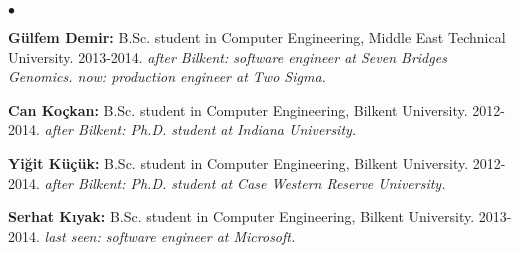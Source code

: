 \documentclass[margin,line]{res}
\newenvironment{list2}{
  \begin{list}{$\bullet$}{%
      \setlength{\itemsep}{0.1cm}
      \setlength{\parsep}{0in} \setlength{\parskip}{0in}
      \setlength{\topsep}{0in} \setlength{\partopsep}{0in} 
      \setlength{\leftmargin}{0.2in}}}{\end{list}}
\begin{document}
\begin{resume}
\begin{list2}
\item {\bf Gülfem Demir:} B.Sc. student in Computer Engineering,  Middle East Technical University. 2013-2014. {\it after Bilkent: software engineer at Seven Bridges Genomics. now: production engineer at Two Sigma.}

\item {\bf Can Koçkan:} B.Sc. student in Computer Engineering,  Bilkent University.  2012-2014. {\it after Bilkent: Ph.D. student at Indiana University.}
\item {\bf Yiğit Küçük:} B.Sc. student in Computer Engineering,  Bilkent University. 2012-2014. {\it after Bilkent: Ph.D. student at Case Western Reserve University.}
\item {\bf Serhat Kıyak:} B.Sc. student in Computer Engineering,  Bilkent University. 2013-2014. {\it last seen: software engineer at Microsoft.}
\end{list2}


\vspace*{-.4cm}

\end{resume}
\end{document}
